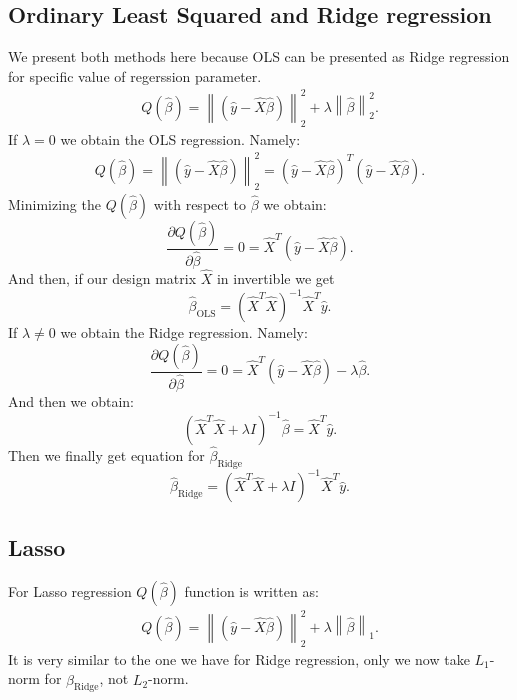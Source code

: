 \documentclass[10pt]{article}
\begin{document}
\subsection{Ordinary Least Squared and Ridge regression}
We present both methods here because OLS can be presented as Ridge regression for specific value of regerssion parameter.
\begin{align}
Q(\hat{\beta})=\left\|\left(\hat{y}-\hat{X}\hat{\beta}\right)\right\|_2^2 + \lambda   \left\|\hat{\beta} \right\|_2^2.
\end{align}
If $\lambda = 0$ we obtain the OLS regression. Namely:
\begin{align}
Q(\hat{\beta})=\left\|\left(\hat{y}-\hat{X}\hat{\beta}\right)\right\|_2^2 = \left(\hat{y}-\hat{X}\hat{\beta}\right)^T\left(\hat{y}-\hat{X}\hat{\beta}\right).
\end{align}
Minimizing the $Q(\hat{\beta})$ with respect to $\hat{\beta}$ we obtain:
\begin{equation}
\frac{\partial Q(\hat{\beta})}{\partial \hat{\beta}} = 0 = \hat{X}^T\left( \hat{y}-\hat{X}\hat{\beta}\right).
\end{equation}
And then, if our design matrix $\hat{X}$ in invertible we get
\begin{equation}
\hat{\beta}_{\text{OLS}} =\left(\hat{X}^T\hat{X}\right)^{-1}\hat{X}^T\hat{y}.
\end{equation}
If $\lambda \neq 0$ we obtain the Ridge regression. Namely:
\begin{equation}
\frac{\partial Q(\hat{\beta})}{\partial \hat{\beta}} = 0 = \hat{X}^T\left( \hat{y}-\hat{X}\hat{\beta}\right) - \lambda \hat{\beta}.
\end{equation}
And then we obtain:
\begin{equation}
\left(\hat{X}^T\hat{X}+ \lambda I \right)^{-1} \hat{\beta} = \hat{X}^T\hat{y}.
\end{equation}
Then we finally get equation for $\hat{\beta}_{\text{Ridge}}$
\begin{equation}
\hat{\beta}_{\text{Ridge}} =\left(\hat{X}^T\hat{X}+ \lambda I \right)^{-1}\hat{X}^T\hat{y}.
\end{equation}
\subsection{Lasso}
For Lasso regression $Q(\hat{\beta})$ function is written as:
\begin{align}
Q(\hat{\beta})=\left\|\left(\hat{y}-\hat{X}\hat{\beta}\right)\right\|_2^2 + \lambda   \left\|\hat{\beta} \right\|_1.
\end{align}
It is very similar to the one we have for Ridge regression, only we now take $L_1$-norm for $\hat{\beta}_{\text{Ridge}}$, not $L_2$-norm.
\end{document}
